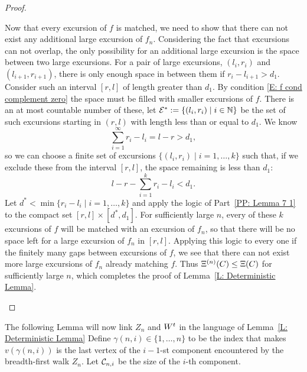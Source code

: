 \begin{proof}
\begin{proofpart}
Now that every excursion of $f$ is matched, 
we need to show that there can not exist any additional large excursion of $f_n$.
Considering the fact that excursions can not overlap,
the only possibility for an additional large excursion is the space between two large excursions.
For a pair of large excursions,
$(l_i, r_i)$ and $(l_{i+1}, r_{i+1})$,
there is only enough space in between them if
$r_i - l_{i+1} > d_1$.
Consider such an interval $[r,l]$ of length greater than $d_1$.
By condition \eqref{E: f cond complement zero} the space must be filled with smaller excursions of $f$.
There is an at most countable number of these,
let $\mathcal{E^*} := \{ (l_i, r_i) \; | \; i \in \mathbb{N} \}$
be the set of such excursions starting in $(r,l)$ with length less than or equal to $d_1$.
We know
\begin{equation}
\sum_{i=1}^{\infty} r_i - l_i = l - r > d_1,
\end{equation}
so we can choose a finite set of excursions
$\{ (l_i, r_i) \; | \; i = 1, \dots, k \}$
such that, 
if we exclude these from the interval $[r,l]$, 
the space remaining is less than $d_1$:
\begin{equation}
l-r - \sum_{i=1}^{k} r_i - l_i < d_1.
\end{equation}
Let $d^* < \min \{ r_i - l_i \; | \; i = 1, \dots, k \}$
and apply the logic of Part~\ref{PP: Lemma 7 1} to the compact set
$[r, l] \times [d^*, d_1]$.
For sufficiently large $n$, 
every of these $k$ excursions of $f$ will be matched with an excursion of $f_n$,
so that there will be no space left for a large excursion of $f_n$ in $[r,l]$.
Applying this logic to every one if the finitely many gaps between excursions of $f$,
we see that there can not exist more large excursions of $f_n$ already matching $f$.
Thus $\Xi^{(n)}(C) \leq \Xi(C)$ for sufficiently large $n$,
which completes the proof of Lemma~\ref{L: Deterministic Lemma}.
\end{proofpart}

	
\end{proof}


The following Lemma will now link $Z_n$ and $W^t$ in the language of Lemma~\ref{L: Deterministic Lemma}
Define $\gamma (n, i) \in \{1, \dots, n\}$ to be the index that makes
$v(\gamma(n,i))$ is the last vertex of the $i-1$-st component encountered by the breadth-first walk $Z_n$.
Let $\mathcal{C}_{n,i}$ be the size of the $i$-th component.


